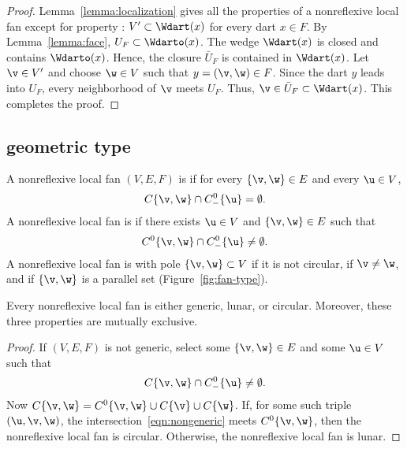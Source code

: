 \begin{proof}
  Lemma~\ref{lemma:localization} gives all the properties of a nonreflexive local fan except for property : $V'\subset \Wdart(x)$ for
  every dart $x\in F$.  By Lemma~\ref{lemma:face}, $U_F \subset
  \Wdarto(x)$.  The wedge $\Wdart(x)$ is closed and contains
  $\Wdarto(x)$. Hence, the closure $\bar U_F$ is contained in
  $\Wdart(x)$.  Let $\v\in V'$ and choose $\w\in V$ such that
  $y=(\v,\w)\in F$.
  Since the dart $y$ leads into $U_F$, every neighborhood of $\v$
  meets $U_F$.  Thus, $\v\in \bar U_F\subset \Wdart(x)$.  This
  completes the proof.
\end{proof}


\subsection{geometric type}\label{sec:types}

\begin{definition}
A nonreflexive local fan $(V,E,F)$ is   if for every $\{\v,\w\}\in E$
and every $\u\in V$, 
\[ 
C\{\v,\w\}\cap C^0_-\{\u\} = \emptyset.
\] 
A nonreflexive local fan is   if there exists $\u\in V$ and
$\{\v,\w\}\in E$ such that
\[ 
C^0\{\v,\w\}\cap C^0_-\{\u\}\ne \emptyset.
\] 
A nonreflexive local fan is  with pole $\{\v,\w\} \subset V$ if it is not
circular, if $\v\ne\w$, and if $\{\v,\w\}$ is a parallel set  (Figure~\ref{fig:fan-type}).
\end{definition}
%
%
%

\figQTCGYTB %


\begin{lemma}[trichotomy]%
Every nonreflexive local fan is either
generic, lunar, or circular.  Moreover, these three properties are
mutually exclusive.
\end{lemma}
%
%
%
%
%

\begin{proof} If $(V,E,F)$ is not generic,  select some $\{\v,\w\}\in E$
and some $\u\in V$ such that
\begin{equation}\label{eqn:nongeneric}
C\{\v,\w\}\cap C^0_-\{\u\} \ne \emptyset.
\end{equation}
Now $C\{\v,\w\} = C^0\{\v,\w\} \cup C\{\v\}\cup C\{\w\}$.  If, for
some such triple $(\u,\v,\w)$, the
intersection~\eqref{eqn:nongeneric} meets $C^0\{\v,\w\}$, then the
nonreflexive local fan is circular.  Otherwise, the nonreflexive local fan is lunar.
\end{proof}

